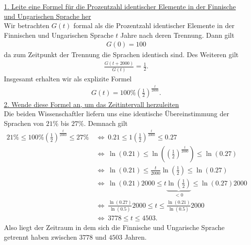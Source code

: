 \underline{1. Leite eine Formel für die Prozentzahl identischer Elemente in der Finnische und Ungarischen Sprache her}\\
Wir betrachten $ G(t) $ formal als die Prozentzahl identischer Elemente in der Finnischen und Ungarischen Sprache $ t $ Jahre nach deren Trennung. Dann gilt 
\begin{align*}
G(0) = 100 %
\end{align*}
da zum Zeitpunkt der Trennung die Sprachen identisch sind.
Des Weiteren gilt
\begin{align*}
\frac{G(t+2000)}{G(t)} = \frac{1}{2}.
\end{align*}
Insgesamt erhalten wir als explizite Formel
\begin{align*}
G(t) = 100 \% \left(\frac{1}{2}\right)^{\frac{t}{2000}}.
\end{align*}
\newpage
\underline{2. Wende diese Formel an, um das Zeitintervall herzuleiten}\\
Die beiden Wissenschaftler liefern uns eine identische Übereinstimmung der Sprachen von $ 21\% $ bis $ 27 \% $.
Demnach gilt
\begin{align*}
21 \% \leq 100 \% \left(\frac{1}{2}\right)^{\frac{t}{2000}} \leq 27 \%
\ 
&\Leftrightarrow
\
0.21 \leq 1 \left(\frac{1}{2}\right)^{\frac{t}{2000}} \leq 0.27\\
\ &\Leftrightarrow \
\ln(0.21) \leq \ln\left( \left(\frac{1}{2}\right)^{\frac{t}{2000}}  \right) \leq \ln(0.27)\\
\ &\Leftrightarrow \
\ln(0.21) \leq \frac{t}{2000} \ln \left(\frac{1}{2}\right) \leq \ln(0.27)\\
\ &\Leftrightarrow \
\ln(0.21) 2000 \leq t \underbrace{\ln \left(\frac{1}{2}\right)}_{< 0} \leq \ln(0.27) 2000\\
\ &\Leftrightarrow \
\frac{\ln(0.27)}{\ln(0.5)} 2000 \leq t  \leq \frac{\ln(0.21)}{\ln(0.5)} 2000 \\
\ &\Leftrightarrow \
3778 \leq t  \leq 4503.
\end{align*}
Also liegt der Zeitraum in dem sich die Finnische und Ungarische Sprache getrennt haben zwischen $ 3778 $ und $ 4503 $ Jahren.
\newpage

